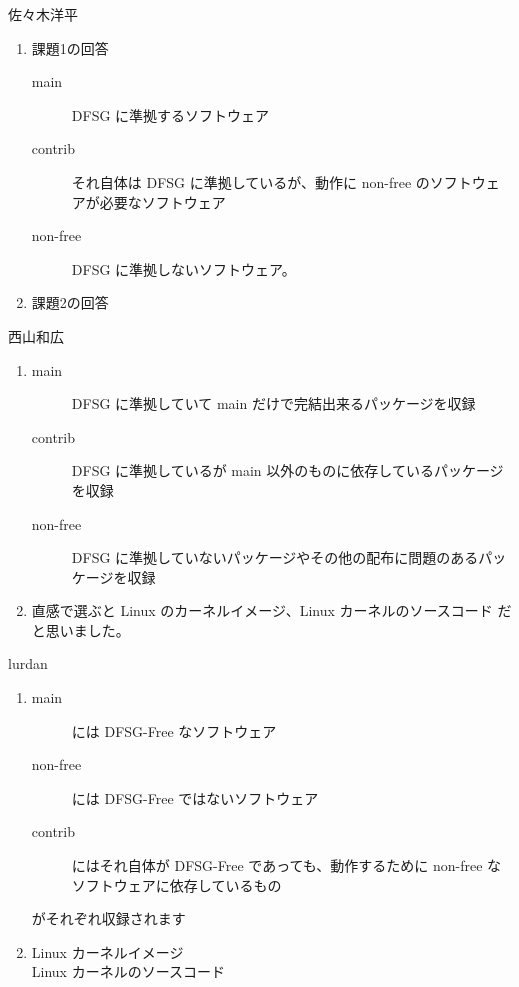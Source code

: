 \documentclass[mingoth,a4paper]{jsarticle}
\begin{document}
\begin{prework}{ 佐々木洋平 }
\begin{enumerate}
  \item 課題1の回答
  \begin{description}
    \item[main] DFSG に準拠するソフトウェア
    \item[contrib] それ自体は DFSG に準拠しているが、動作に non-free のソフトウェアが必要なソフトウェア
    \item[non-free] DFSG に準拠しないソフトウェア。
  \end{description}
  \item 課題2の回答
\end{enumerate}
\end{prework}

\begin{prework}{ 西山和広 }
  \begin{enumerate}
  \item
    \begin{description}
    \item [main] DFSG に準拠していて main だけで完結出来るパッケージを収録
    \item [contrib] DFSG に準拠しているが main 以外のものに依存しているパッケージを収録
    \item [non-free] DFSG に準拠していないパッケージやその他の配布に問題のあるパッケージを収録
    \end{description}
  \item 直感で選ぶと Linux のカーネルイメージ、Linux カーネルのソースコード だと思いました。
  \end{enumerate}
\end{prework}

\begin{prework}{ lurdan }
  \begin{enumerate}
  \item
    \begin{description}
    \item [main]には DFSG-Free なソフトウェア
    \item [non-free]には DFSG-Free ではないソフトウェア
    \item [contrib]にはそれ自体が DFSG-Free であっても、動作するために non-free なソフトウェアに依存しているもの
    \end{description}
    がそれぞれ収録されます
  \item Linux カーネルイメージ\\
    Linux カーネルのソースコード
  \end{enumerate}
\end{prework}
\end{document}
